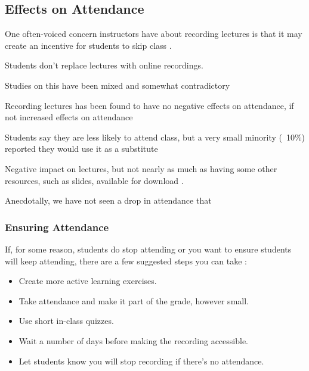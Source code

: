 \documentclass[sigconf]{acmart}
\begin{document}







\subsection{Effects on Attendance}
One often-voiced concern instructors have about recording lectures is that it may create an incentive for students to skip class \cite{larkin2010but} \cite{young2008lectures}.


Students don't replace lectures with online recordings.\cite{larkin2010but}

Studies on this have been mixed and somewhat contradictory \cite{bos2016use}


Recording lectures has been found to have no negative effects on attendance, if not increased effects on attendance \cite{shimoff2001effects}


Students say they are less likely to attend class, but a very small minority (~10\%) reported they would use it as a substitute \cite{maynor2013student}

Negative impact on lectures, but not nearly as much as having some other resources, such as slides, available for download 
\cite{traphagan2010impact}.

Anecdotally, we have not seen a drop in attendance that 

\subsubsection{Ensuring Attendance}
If, for some reason, students do stop attending or you want to ensure students will keep attending, there are a few suggested steps you can take \cite{larkin2010but} \cite{young2008lectures}:
\begin{itemize}
	\item Create more active learning exercises.
	
	\item Take attendance and make it part of the grade, however small.
	\item Use short in-class quizzes.
	\item Wait a number of days before making the recording accessible.
	\item Let students know you will stop recording if there's no attendance. 
\end{itemize}
\end{document}
